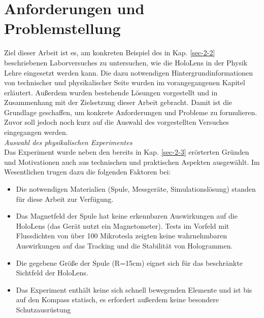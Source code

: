 \section{Anforderungen und Problemstellung}
\label{sec-3}
\begin{comment}
\begin{center}
\fbox{
\parbox{0.9\linewidth}{
\textit{Ziel des Kapitels:}\\
Anforderungen von technischer und anwendungsorientierter Seite darstellen und Problem formulieren.
}}\\
\end{center}
\end{comment}

Ziel dieser Arbeit ist es, am konkreten Beispiel des in Kap. \ref{sec-2-2} beschriebenen Laborversuches zu untersuchen, wie die HoloLens in der Physik Lehre eingesetzt werden kann. Die dazu notwendigen Hintergrundinformationen von technischer und physikalischer Seite wurden im vorangegangenen Kapitel erläutert. Außerdem wurden bestehende Lösungen vorgestellt und in Zusammenhang mit der Zielsetzung dieser Arbeit gebracht. Damit ist die Grundlage geschaffen, um konkrete Anforderungen und Probleme zu formulieren. Zuvor soll jedoch noch kurz auf die Auswahl des vorgestellten Versuches eingegangen werden.\\

\textit{Auswahl des physikalischen Experimentes}\\
Das Experiment wurde neben den bereits in Kap. \ref{sec-2-3} erörterten Gründen und Motivationen auch aus technischen und praktischen Aspekten ausgewählt. Im Wesentlichen trugen dazu die folgenden Faktoren bei:
\begin{itemize}
	\setlength{\itemsep}{-1pt}
	\singlespacing
	\item Die notwendigen Materialien (Spule, Messgeräte, Simulationslösung) standen für diese Arbeit zur Verfügung.
	\item Das Magnetfeld der Spule hat keine erkennbaren Auswirkungen auf die HoloLens (das Gerät nutzt ein Magnetometer). Tests im Vorfeld mit Flussdichten von über 100 Mikrotesla zeigten keine wahrnehmbaren Auswirkungen auf das Tracking und die Stabilität von Hologrammen.
	\item Die gegebene Größe der Spule (R=15cm) eignet sich für das beschränkte Sichtfeld der HoloLens.
	\item Das Experiment enthält keine sich schnell bewegenden Elemente und ist bis auf den Kompass statisch, es erfordert außerdem keine besondere Schutzausrüstung%
\end{itemize}

